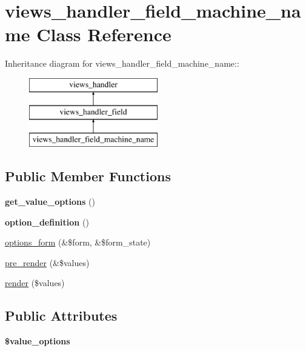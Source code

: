 \hypertarget{classviews__handler__field__machine__name}{
\section{views\_\-handler\_\-field\_\-machine\_\-name Class Reference}
\label{classviews__handler__field__machine__name}
}
Inheritance diagram for views\_\-handler\_\-field\_\-machine\_\-name::\begin{figure}[H]
\begin{center}
\leavevmode
\includegraphics[height=3cm]{classviews__handler__field__machine__name}
\end{center}
\end{figure}
\subsection*{Public Member Functions}
\begin{DoxyCompactItemize}
\item 
\hypertarget{classviews__handler__field__machine__name_abb1c01ddd035e8201aa56b9d50f01913}{
{\bfseries get\_\-value\_\-options} ()}
\label{classviews__handler__field__machine__name_abb1c01ddd035e8201aa56b9d50f01913}

\item 
\hypertarget{classviews__handler__field__machine__name_ae522b1be17cee3fe89e5a36af89f6319}{
{\bfseries option\_\-definition} ()}
\label{classviews__handler__field__machine__name_ae522b1be17cee3fe89e5a36af89f6319}

\item 
\hyperlink{classviews__handler__field__machine__name_adb13ceea9d5b358c87dad564b36078f7}{options\_\-form} (\&\$form, \&\$form\_\-state)
\item 
\hyperlink{classviews__handler__field__machine__name_a59f0fefb006bc18fd3bd357df1fb75fa}{pre\_\-render} (\&\$values)
\item 
\hyperlink{classviews__handler__field__machine__name_aa825279a03869f72671e453f5f75dfde}{render} (\$values)
\end{DoxyCompactItemize}
\subsection*{Public Attributes}
\begin{DoxyCompactItemize}
\item 
\hypertarget{classviews__handler__field__machine__name_a89e915092775e2dbbd4cb7307128c019}{
{\bfseries \$value\_\-options}}
\label{classviews__handler__field__machine__name_a89e915092775e2dbbd4cb7307128c019}

\end{DoxyCompactItemize}


